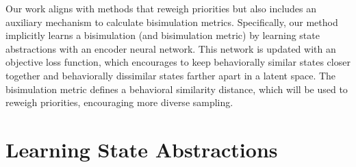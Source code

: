 Our work aligns with methods that reweigh priorities but also includes an auxiliary mechanism to calculate bisimulation metrics. Specifically, our method implicitly learns a bisimulation (and bisimulation metric) by learning state abstractions with an encoder neural network. This network is updated with an objective loss function, which encourages to keep behaviorally similar states closer together and behaviorally dissimilar states farther apart in a latent space. The bisimulation metric defines a behavioral similarity distance, which will be used to reweigh priorities, encouraging more diverse sampling.



\section{Learning State Abstractions}



